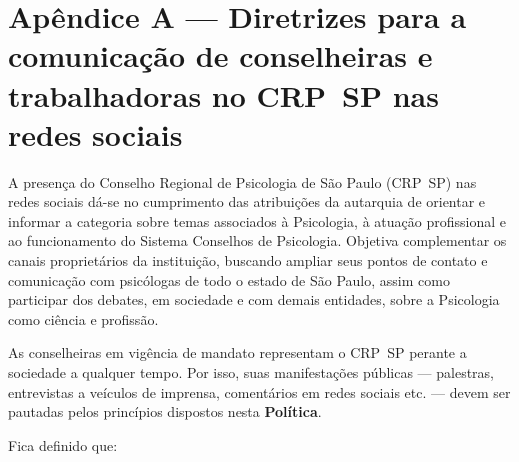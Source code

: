 \chapter{Apêndice A --- Diretrizes para a comunicação de conselheiras e
  trabalhadoras no CRP~SP nas redes
  sociais}

A presença do Conselho Regional de Psicologia de São Paulo (CRP~SP) nas
redes sociais dá-se no cumprimento das atribuições da autarquia de
orientar e informar a categoria sobre temas associados à Psicologia, à
atuação profissional e ao funcionamento do Sistema Conselhos de
Psicologia. Objetiva complementar os canais proprietários da
instituição, buscando ampliar seus pontos de contato e comunicação com
psicólogas de todo o estado de São Paulo, assim como participar dos
debates, em sociedade e com demais entidades, sobre a Psicologia como
ciência e profissão.

As conselheiras em vigência de mandato representam o CRP~SP perante a
sociedade a qualquer tempo. Por isso, suas manifestações públicas ---
palestras, entrevistas a veículos de imprensa, comentários em redes
sociais etc. --- devem ser pautadas pelos princípios dispostos nesta
\textbf{Política}.

Fica definido que:

